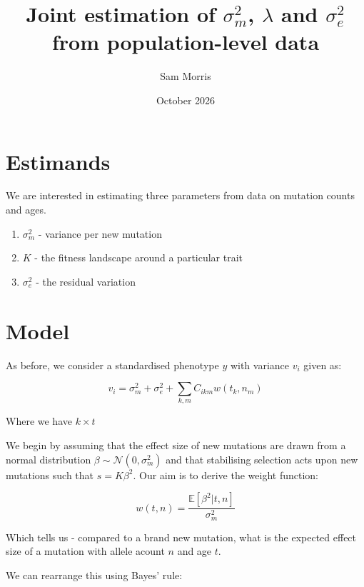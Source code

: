 \documentclass{article}
\title{Joint estimation of $\sigma_{m}^{2}$, $\lambda$ and $\sigma_{e}^{2}$ from population-level data}
\author{Sam Morris}
\date{October 2026}
\begin{document}
\maketitle

\section{Estimands}

We are interested in estimating three parameters from data on mutation counts and ages.

\begin{enumerate}
    \item $\sigma^2_m$ - variance per new mutation
    \item $K$ - the fitness landscape around a particular trait
    \item $\sigma^2_e$ - the residual variation
\end{enumerate}

\section{Model}

As before, we consider a standardised phenotype $y$ with variance $v_i$ given as:

\begin{equation}
    v_i = \sigma^2_m + \sigma^2_e + \sum_{k,m} C_{ikm} w(t_k, n_m)
\end{equation}

Where we have $k \times t$

We begin by assuming that the effect size of new mutations are drawn from a normal distribution $\beta \sim \mathcal{N}(0, \sigma^2_m)$ and that stabilising selection acts upon new mutations such that $s = K  \beta^2$. Our aim is to derive the weight function:

\begin{equation}
    w(t, n) = \frac{\mathbb{E}[\beta^2 | t, n]}{\sigma^2_m}
\end{equation}

Which tells us - compared to a brand new mutation, what is the expected effect size of a mutation with allele acount $n$ and age $t$.

We can rearrange this using Bayes' rule:

\begin{align}

\end{align}
\end{document}
